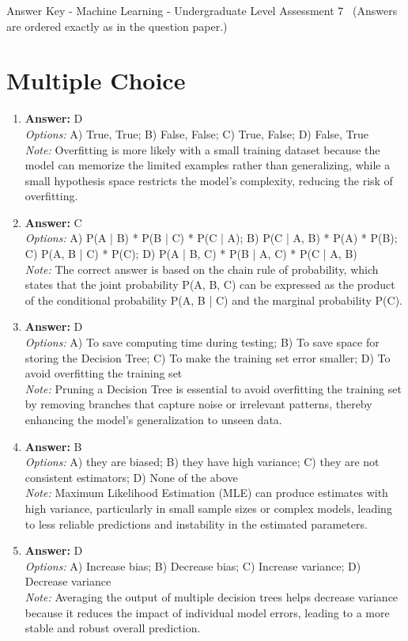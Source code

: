 \documentclass[12pt]{article}
\begin{document}
\begin{center}
Answer Key - Machine Learning - Undergraduate Level Assessment 7 \
\small (Answers are ordered exactly as in the question paper.)
\end{center}

\section*{Multiple Choice}
\begin{enumerate}[label=\arabic*.]
\item \textbf{Answer:} D
\\ \textit{Options:} A) True, True; B) False, False; C) True, False; D) False, True
\\ \textit{Note:} Overfitting is more likely with a small training dataset because the model can memorize the limited examples rather than generalizing, while a small hypothesis space restricts the model's complexity, reducing the risk of overfitting.
\item \textbf{Answer:} C
\\ \textit{Options:} A) P(A | B) * P(B | C) * P(C | A); B) P(C | A, B) * P(A) * P(B); C) P(A, B | C) * P(C); D) P(A | B, C) * P(B | A, C) * P(C | A, B)
\\ \textit{Note:} The correct answer is based on the chain rule of probability, which states that the joint probability P(A, B, C) can be expressed as the product of the conditional probability P(A, B | C) and the marginal probability P(C).
\item \textbf{Answer:} D
\\ \textit{Options:} A) To save computing time during testing; B) To save space for storing the Decision Tree; C) To make the training set error smaller; D) To avoid overfitting the training set
\\ \textit{Note:} Pruning a Decision Tree is essential to avoid overfitting the training set by removing branches that capture noise or irrelevant patterns, thereby enhancing the model's generalization to unseen data.
\item \textbf{Answer:} B
\\ \textit{Options:} A) they are biased; B) they have high variance; C) they are not consistent estimators; D) None of the above
\\ \textit{Note:} Maximum Likelihood Estimation (MLE) can produce estimates with high variance, particularly in small sample sizes or complex models, leading to less reliable predictions and instability in the estimated parameters.
\item \textbf{Answer:} D
\\ \textit{Options:} A) Increase bias; B) Decrease bias; C) Increase variance; D) Decrease variance
\\ \textit{Note:} Averaging the output of multiple decision trees helps decrease variance because it reduces the impact of individual model errors, leading to a more stable and robust overall prediction.
\end{enumerate}
\end{document}
